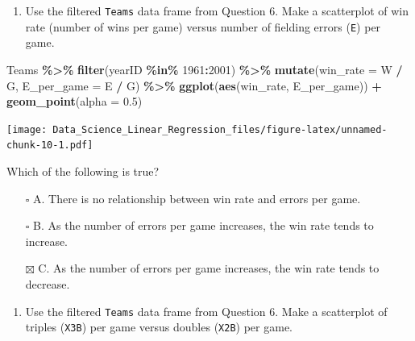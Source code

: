 \documentclass[
]{article}
\newenvironment{Shaded}{\begin{snugshade}}{\end{snugshade}}
\newcommand{\DataTypeTok}[1]{\textcolor[rgb]{0.13,0.29,0.53}{#1}}
\newcommand{\DecValTok}[1]{\textcolor[rgb]{0.00,0.00,0.81}{#1}}
\newcommand{\FloatTok}[1]{\textcolor[rgb]{0.00,0.00,0.81}{#1}}
\newcommand{\KeywordTok}[1]{\textcolor[rgb]{0.13,0.29,0.53}{\textbf{#1}}}
\newcommand{\NormalTok}[1]{#1}
\newcommand{\OperatorTok}[1]{\textcolor[rgb]{0.81,0.36,0.00}{\textbf{#1}}}
\newcommand{\StringTok}[1]{\textcolor[rgb]{0.31,0.60,0.02}{#1}}
\providecommand{\tightlist}{%
  \setlength{\itemsep}{0pt}\setlength{\parskip}{0pt}}
\begin{document}
\begin{enumerate}
\def\labelenumi{\arabic{enumi}.}
\setcounter{enumi}{6}
\tightlist
\item
  Use the filtered \texttt{Teams} data frame from Question 6. Make a
  scatterplot of win rate (number of wins per game) versus number of
  fielding errors (\texttt{E}) per game.
\end{enumerate}

\begin{Shaded}
\begin{Highlighting}[]
\NormalTok{Teams }\OperatorTok{\%\textgreater{}\%}\StringTok{ }\KeywordTok{filter}\NormalTok{(yearID }\OperatorTok{\%in\%}\StringTok{ }\DecValTok{1961}\OperatorTok{:}\DecValTok{2001}\NormalTok{) }\OperatorTok{\%\textgreater{}\%}
\StringTok{  }\KeywordTok{mutate}\NormalTok{(}\DataTypeTok{win\_rate =}\NormalTok{ W }\OperatorTok{/}\StringTok{ }\NormalTok{G, }\DataTypeTok{E\_per\_game =}\NormalTok{ E }\OperatorTok{/}\StringTok{ }\NormalTok{G) }\OperatorTok{\%\textgreater{}\%}
\StringTok{  }\KeywordTok{ggplot}\NormalTok{(}\KeywordTok{aes}\NormalTok{(win\_rate, E\_per\_game)) }\OperatorTok{+}\StringTok{ }
\StringTok{  }\KeywordTok{geom\_point}\NormalTok{(}\DataTypeTok{alpha =} \FloatTok{0.5}\NormalTok{)}
\end{Highlighting}
\end{Shaded}

\texttt{[image: Data\_Science\_Linear\_Regression\_files/figure-latex/unnamed-chunk-10-1.pdf]}

Which of the following is true?

\begin{itemize}
\tightlist
\item[$\square$]
  A. There is no relationship between win rate and errors per game.
\item[$\square$]
  B. As the number of errors per game increases, the win rate tends to
  increase.
\item[$\boxtimes$]
  C. As the number of errors per game increases, the win rate tends to
  decrease.
\end{itemize}

\begin{enumerate}
\def\labelenumi{\arabic{enumi}.}
\setcounter{enumi}{7}
\tightlist
\item
  Use the filtered \texttt{Teams} data frame from Question 6. Make a
  scatterplot of triples (\texttt{X3B}) per game versus doubles
  (\texttt{X2B}) per game.
\end{enumerate}
\end{document}
